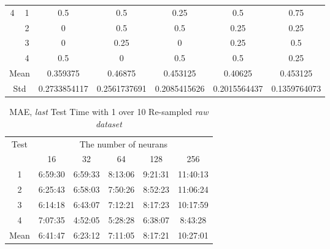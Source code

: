 \documentclass[draft,dvipsnames]{drexel-thesis}
\begin{document}
\begin{thesis}
\begin{table}[!t]
\begin{tabular}{|c|c|c|c|c|c|c|}
\multirow{4}{*}{4}    & 1                   & 0.5          & 0.5          & 0.25         & 0.5          & 0.75         \\ \cline{2-7} 
                      & 2                   & 0            & 0.5          & 0.5          & 0.25         & 0.25         \\ \cline{2-7} 
                      & 3                   & 0            & 0.25         & 0            & 0.25         & 0.5          \\ \cline{2-7} 
                      & 4                   & 0.5          & 0            & 0.5          & 0.5          & 0.25         \\ \hline
\multicolumn{2}{|c|}{Mean}                  & 0.359375     & 0.46875      & 0.453125     & 0.40625      & 0.453125     \\ \hline
\multicolumn{2}{|c|}{Std}                   & 0.2733854117 & 0.2561737691 & 0.2085415626 & 0.2015564437 & 0.1359764073 \\ \hline
\end{tabular}
\end{table}

\begin{table}[!t]
\centering
\caption{MAE, {\em last} Test Time with 1 over 10 Re-sampled {\em raw dataset}}
\label{tbl:mae_last_1_10_time}
\begin{tabular}{|c|c|c|c|c|c|}
\hline
\multirow{2}{*}{Test} & \multicolumn{5}{c|}{The number of neurans}       \\ \cline{2-6} 
                      & 16      & 32      & 64      & 128     & 256      \\ \hline
1                     & 6:59:30 & 6:59:33 & 8:13:06 & 9:21:31 & 11:40:13 \\ \hline
2                     & 6:25:43 & 6:58:03 & 7:50:26 & 8:52:23 & 11:06:24 \\ \hline
3                     & 6:14:18 & 6:43:07 & 7:12:21 & 8:17:23 & 10:17:59 \\ \hline
4                     & 7:07:35 & 4:52:05 & 5:28:28 & 6:38:07 & 8:43:28  \\ \hline
Mean                  & 6:41:47 & 6:23:12 & 7:11:05 & 8:17:21 & 10:27:01 \\ \hline
\end{tabular}
\end{table}


\end{thesis}
\end{document}
